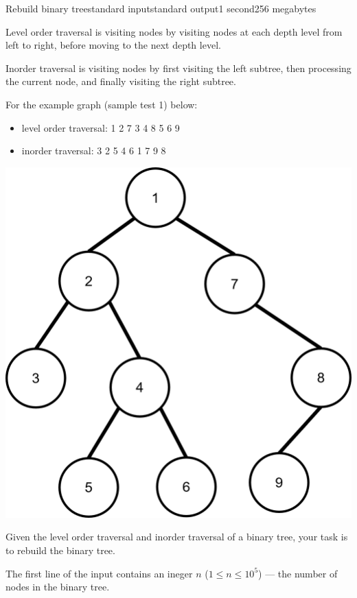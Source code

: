 \begin{problem}{Rebuild binary tree}{standard input}{standard output}{1 second}{256 megabytes}

Level order traversal is visiting nodes by visiting nodes at each depth level from left to right, before moving to the next depth level.

Inorder traversal is visiting nodes by first visiting the left subtree, then processing the current node, and finally visiting the right subtree.

For the example graph (sample test 1) below:
\begin{itemize}
\item level order traversal: 1 2 7 3 4 8 5 6 9
\item inorder traversal: 3 2 5 4 6 1 7 9 8
\end{itemize}

\begin{center}
\includegraphics[scale=0.25]{binarytree.png}
\end{center}

Given the level order traversal and inorder traversal of a binary tree, your task is to rebuild the binary tree.

\InputFile
The first line of the input contains an ineger $n$ ($1\le n\le 10^5$) --- the number of nodes in the binary tree.


\end{problem}
